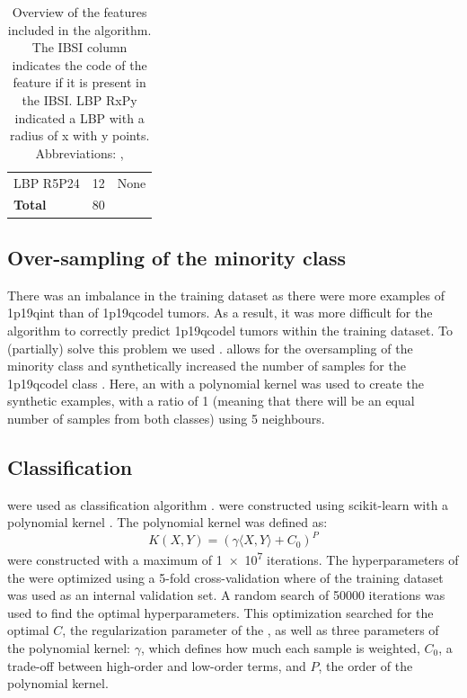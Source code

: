 \begin{subappendices}
\begin{table}[htbp]
\begin{tabular}{L{3.9cm}R{0.3cm}L{5.7cm}}
        \hspace{1em}\acrshort{LBP} R5P24 & 12 & None \\
        \addlinespace
        \textbf{Total} & 80 & \\
        \bottomrule
    \end{tabular}
    \caption{Overview of the features included in the algorithm. The \acrshort{IBSI} column indicates the code of the feature if it is present in the \acrshort{IBSI}. \acrshort{LBP} RxPy indicated a \acrshort{LBP} with a radius of x with y points. Abbreviations: , }\label{tab:LGG_1p19q_ISBI}
\end{table}

\subsection{Over-sampling of the minority class}
There was an imbalance in the training dataset as there were more examples of \acl{1p19qint} than of \acl{1p19qcodel} \glspl{tumor}.
As a result, it was more difficult for the algorithm to correctly predict \acl{1p19qcodel} \glspl{tumor} within the training dataset.
To (partially) solve this problem we used .
 allows for the oversampling of the minority class and synthetically increased the number of samples for the \acl{1p19qcodel} class \autocite{chawla2002smote}.
Here, an  with a polynomial kernel was used to create the synthetic examples, with a ratio of 1 (meaning that there will be an equal number of samples from both classes) using 5 neighbours.

\subsection{Classification}
 were used as classification algorithm \autocite{cortes1995support}.
 were constructed using scikit-learn with a polynomial kernel \autocite{pedregosa2011scikit}.
The polynomial kernel was defined as:
\begin{equation*}
    K(X, Y) = {\left(\gamma \langle X, Y \rangle + C_0\right)}^P
\end{equation*}
 were constructed with a maximum of \num{1e7} iterations.
The hyperparameters of the  were optimized using a 5-fold cross-validation where  of the training dataset was used as an internal validation set.
A random search of \num{50000} iterations was used to find the optimal hyperparameters.
This optimization searched for the optimal $C$, the regularization parameter of the , as well as three parameters of the polynomial kernel: $\gamma$, which defines how much each sample is weighted, $C_0$, a trade-off between high-order and low-order terms, and $P$, the order of the polynomial kernel.


\end{subappendices}
